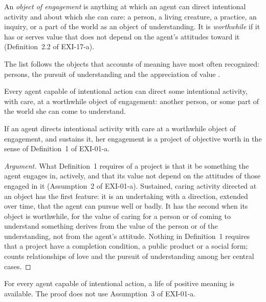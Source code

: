 \documentclass{situationist-preprint}
\begin{document}
\begin{definition}\label{d:object}
An \emph{object of engagement} is anything at which an agent can direct intentional activity and about which she can care: a person, a living creature, a practice, an inquiry, or a part of the world as an object of understanding. It is \emph{worthwhile} if it has or serves value that does not depend on the agent's attitudes toward it (Definition~2.2 of EXI-17-a).
\end{definition}

The list follows the objects that accounts of meaning have most often recognized: persons, the pursuit of understanding and the appreciation of value \citep{Metz2013}.

\begin{assumption}[Reach]\label{a:reach}
Every agent capable of intentional action can direct some intentional activity, with care, at a worthwhile object of engagement: another person, or some part of the world she can come to understand.
\end{assumption}

\begin{lemma}\label{l:proj}
If an agent directs intentional activity with care at a worthwhile object of engagement, and sustains it, her engagement is a project of objective worth in the sense of Definition~1 of EXI-01-a.
\end{lemma}

\begin{proof}[Argument]
What Definition~1 requires of a project is that it be something the agent engages in, actively, and that its value not depend on the attitudes of those engaged in it (Assumption~2 of EXI-01-a). Sustained, caring activity directed at an object has the first feature: it is an undertaking with a direction, extended over time, that the agent can pursue well or badly. It has the second when its object is worthwhile, for the value of caring for a person or of coming to understand something derives from the value of the person or of the understanding, not from the agent's attitude. Nothing in Definition~1 requires that a project have a completion condition, a public product or a social form; \citet{Wolf2010} counts relationships of love and the pursuit of understanding among her central cases.
\end{proof}

\begin{theorem}\label{t:main}
For every agent capable of intentional action, a life of positive meaning is available. The proof does not use Assumption~3 of EXI-01-a.
\end{theorem}
\end{document}

